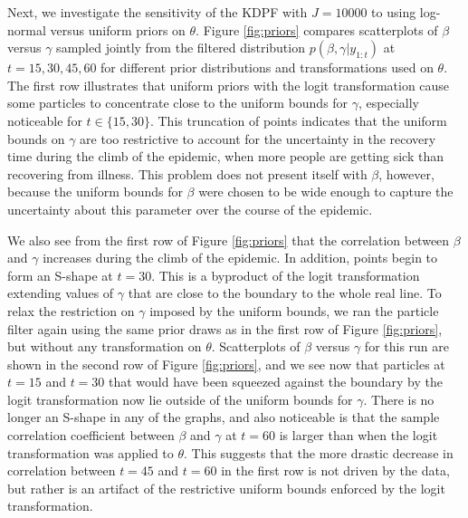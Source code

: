 \documentclass{elsarticle}
\begin{document}
Next, we investigate the sensitivity of the KDPF with $J = 10000$ to using log-normal versus uniform priors on $\theta$.  Figure \ref{fig:priors} compares scatterplots of $\beta$ versus $\gamma$ sampled jointly from the filtered distribution $p(\beta,\gamma|y_{1:t})$ at $t = 15, 30, 45, 60$ for different prior distributions and transformations used on $\theta$. The first row illustrates that uniform priors with the logit transformation cause some particles to concentrate close to the uniform bounds for $\gamma$, especially noticeable for $t \in \{15, 30\}$.  This truncation of points indicates that the uniform bounds on $\gamma$ are too restrictive to account for the uncertainty in the recovery time during the climb of the epidemic, when more people are getting sick than recovering from illness. This problem does not present itself with $\beta$, however, because the uniform bounds for $\beta$ were chosen to be wide enough to capture the uncertainty about this parameter over the course of the epidemic.

We also see from the first row of Figure \ref{fig:priors} that the correlation between $\beta$ and $\gamma$ increases during the climb of the epidemic. In addition, points begin to form an S-shape at $t = 30$. This is a byproduct of the logit transformation extending values of $\gamma$ that are close to the boundary to the whole real line. To relax the restriction on $\gamma$ imposed by the uniform bounds, we ran the particle filter again using the same prior draws as in the first row of Figure \ref{fig:priors}, but without any transformation on $\theta$. Scatterplots of $\beta$ versus $\gamma$ for this run are shown in the second row of Figure \ref{fig:priors}, and we see now that particles at $t = 15$ and $t = 30$ that would have been squeezed against the boundary by the logit transformation now lie outside of the uniform bounds for $\gamma$. There is no longer an S-shape in any of the graphs, and also noticeable is that the sample correlation coefficient between $\beta$ and $\gamma$ at $t = 60$ is larger than when the logit transformation was applied to $\theta$. This suggests that the more drastic decrease in correlation between $t = 45$ and $t = 60$ in the first row is not driven by the data, but rather is an artifact of the restrictive uniform bounds enforced by the logit transformation.
\end{document}
